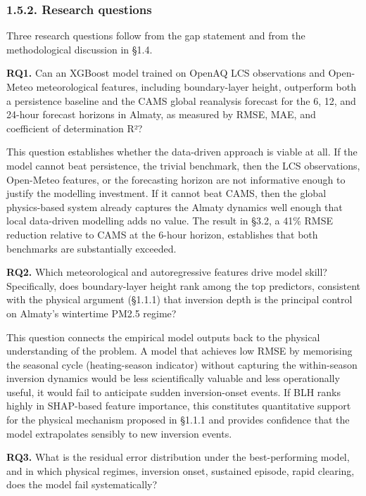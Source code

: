 \subsubsection{1.5.2. Research questions}\label{research-questions}

Three research questions follow from the gap statement and from the methodological discussion in §1.4.

\textbf{RQ1.} Can an XGBoost model trained on OpenAQ LCS observations and Open-Meteo meteorological features, including boundary-layer height, outperform both a persistence baseline and the CAMS global reanalysis forecast for the 6, 12, and 24-hour forecast horizons in Almaty, as measured by RMSE, MAE, and coefficient of determination R²?

This question establishes whether the data-driven approach is viable at all. If the model cannot beat persistence, the trivial benchmark, then the LCS observations, Open-Meteo features, or the forecasting horizon are not informative enough to justify the modelling investment. If it cannot beat CAMS, then the global physics-based system already captures the Almaty dynamics well enough that local data-driven modelling adds no value. The result in §3.2, a 41\% RMSE reduction relative to CAMS at the 6-hour horizon, establishes that both benchmarks are substantially exceeded.

\textbf{RQ2.} Which meteorological and autoregressive features drive model skill? Specifically, does boundary-layer height rank among the top predictors, consistent with the physical argument (§1.1.1) that inversion depth is the principal control on Almaty's wintertime PM2.5 regime?

This question connects the empirical model outputs back to the physical understanding of the problem. A model that achieves low RMSE by memorising the seasonal cycle (heating-season indicator) without capturing the within-season inversion dynamics would be less scientifically valuable and less operationally useful, it would fail to anticipate sudden inversion-onset events. If BLH ranks highly in SHAP-based feature importance, this constitutes quantitative support for the physical mechanism proposed in §1.1.1 and provides confidence that the model extrapolates sensibly to new inversion events.

\textbf{RQ3.} What is the residual error distribution under the best-performing model, and in which physical regimes, inversion onset, sustained episode, rapid clearing, does the model fail systematically?

